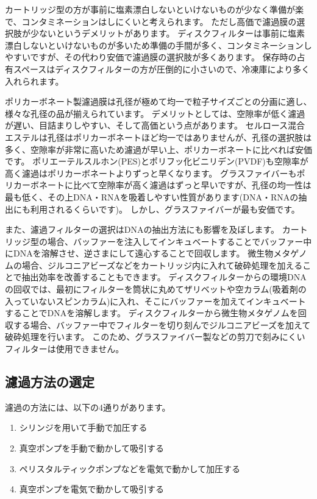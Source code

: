 \documentclass[titlepage,10pt,a4paper,uplatex]{jsbook}
\begin{document}
カートリッジ型の方が事前に塩素漂白しないといけないものが少なく準備が楽で、コンタミネーションはしにくいと考えられます。
ただし高価で濾過膜の選択肢が少ないというデメリットがあります。
ディスクフィルターは事前に塩素漂白しないといけないものが多いため準備の手間が多く、コンタミネーションしやすいですが、その代わり安価で濾過膜の選択肢が多くあります。
保存時の占有スペースはディスクフィルターの方が圧倒的に小さいので、冷凍庫により多く入れられます。

ポリカーボネート製濾過膜は孔径が極めて均一で粒子サイズごとの分画に適し、様々な孔径の品が揃えられています。
デメリットとしては、空隙率が低く濾過が遅い、目詰まりしやすい、そして高価という点があります。
セルロース混合エステルは孔径はポリカーボネートほど均一ではありませんが、孔径の選択肢は多く、空隙率が非常に高いため濾過が早い上、ポリカーボネートに比べれば安価です。
ポリエーテルスルホン(PES)とポリフッ化ビニリデン(PVDF)も空隙率が高く濾過はポリカーボネートよりずっと早くなります。
グラスファイバーもポリカーボネートに比べて空隙率が高く濾過はずっと早いですが、孔径の均一性は最も低く、その上DNA・RNAを吸着しやすい性質があります(DNA・RNAの抽出にも利用されるくらいです)。
しかし、グラスファイバーが最も安価です。

また、濾過フィルターの選択はDNAの抽出方法にも影響を及ぼします。
カートリッジ型の場合、バッファーを注入してインキュベートすることでバッファー中にDNAを溶解させ、逆さまにして遠心することで回収します\citep{Miya2016}。
微生物メタゲノムの場合、ジルコニアビーズなどをカートリッジ内に入れて破砕処理を加えることで抽出効率を改善することもできます\citep{Ushio2019}。
ディスクフィルターからの環境DNAの回収では、最初にフィルターを筒状に丸めてザリベットや空カラム(吸着剤の入っていないスピンカラム)に入れ、そこにバッファーを加えてインキュベートすることでDNAを溶解します。
ディスクフィルターから微生物メタゲノムを回収する場合、バッファー中でフィルターを切り刻んでジルコニアビーズを加えて破砕処理を行います。
このため、グラスファイバー製などの剪刀で刻みにくいフィルターは使用できません。

\subsection{濾過方法の選定}

濾過の方法には、以下の4通りがあります。

\begin{enumerate}
\item シリンジを用いて手動で加圧する
\item 真空ポンプを手動で動かして吸引する
\item ペリスタルティックポンプなどを電気で動かして加圧する
\item 真空ポンプを電気で動かして吸引する
\end{enumerate}
\end{document}
